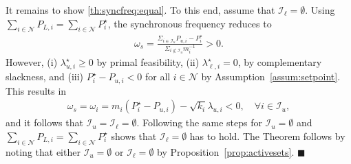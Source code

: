 \documentclass[twocolumn,twoside,journal]{IEEEtran}
\newcommand{\mc}{\mathcal}
\begin{document}

It remains to show \ref{th:syncfreq:equal}. To this end, assume that $\mathcal{I}_{\ell} = \emptyset$. Using $\sum_{i \in \mc N} P_{L,i} = \sum_{i \in \mc N} P^\star_i$, the synchronous frequency reduces to 
\begin{align*}
    \omega_{s} = \frac{\Sigma_{i \in \mathcal{I}_{u}}P_{u, i} - P^\star_{i}}{\Sigma_{i \notin \mathcal{I}_{u}} m_{i}^{-1}} > 0.
\end{align*}
However, (i) $\lambda^\star_{u,i}\geq 0$ by primal feasibility, (ii) $\lambda^\star_{\ell,i}=0$, by complementary slackness, and (iii) $P^\star_i - P_{u, i}<0$ for all $i \in \mc N$ by Assumption~\ref{assum:setpoint}. This results in 
\begin{align*}
\omega_s = \omega_i = m_i\left(P^\star_i - P_{u, i}\right) - \sqrt{k_i}\lambda_{u, i} < 0, \quad \forall i \in \mathcal{I}_{u},
\end{align*}
and it follows that $\mathcal{I}_{u} = \mathcal{I}_{\ell} = \emptyset$. Following the same steps for $\mathcal{I}_u = \emptyset$ and $\sum_{i \in \mc N} P_{L,i} = \sum_{i \in \mc N} P^\star_i$ shows that $\mathcal{I}_\ell = \emptyset$ has to hold. The Theorem follows by noting that either $\mc I_u=\emptyset$ or $\mc I_\ell=\emptyset$ by Proposition~\ref{prop:activesets}. \hfill $\blacksquare$
\end{document}

